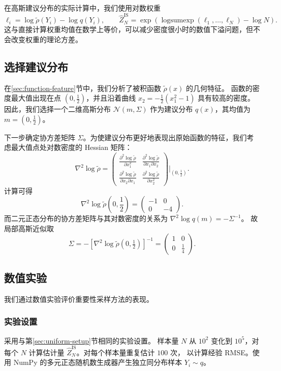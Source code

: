 \documentclass[12pt,a4paper]{ctexart}
\newcommand{\rhoT}{\widetilde{\rho}}
\begin{document}
在高斯建议分布的实际计算中，我们使用对数权重
\[
\ell_i=\log\rhoT(Y_i)-\log q(Y_i),\qquad
\widehat Z_N^{\mathrm{IS}}
=\exp\left(\operatorname{logsumexp}(\ell_1,\ldots,\ell_N)-\log N\right).
\]
这与直接计算权重均值在数学上等价，可以减少密度很小时的数值下溢问题，但不会改变权重的理论方差。

\subsection{选择建议分布}

在\ref{sec:function-feature}节中，我们分析了被积函数 $\rhoT(x)$ 的几何特征。
函数的密度最大值出现在点 $(0, \frac12)$，并且沿着曲线 $x_2 = -\frac12(x_1^2-1)$ 具有较高的密度。
因此，我们选择一个二维高斯分布 $\mathcal N(m, \Sigma)$ 作为建议分布 $q(x)$，其均值为 $m=(0, \frac12)$。

下一步确定协方差矩阵 $\Sigma$。为使建议分布更好地表现出原始函数的特征，我们考虑最大值点处对数密度的 Hessian 矩阵：
\[
\nabla^2 \log\rhoT = \begin{pmatrix}
\frac{\partial^2 \log\rhoT}{\partial x_1^2} & \frac{\partial^2 \log\rhoT}{\partial x_1 \partial x_2} \\
\frac{\partial^2 \log\rhoT}{\partial x_2 \partial x_1} & \frac{\partial^2 \log\rhoT}{\partial x_2^2}
\end{pmatrix}\Bigg|_{(0, \frac12)}.
\]
计算可得
\[
\nabla^2 \log\rhoT(0, \frac12) = \begin{pmatrix}
-1 & 0 \\
0 & -4
\end{pmatrix}.
\]
而二元正态分布的协方差矩阵与其对数密度的关系为 $\nabla^2\log q(m)=-\Sigma^{-1}$。
故局部高斯近似取
\[
\Sigma = -\left[\nabla^2\log\rhoT(0,\tfrac12)\right]^{-1}
= \begin{pmatrix}1 & 0 \\ 0 & \frac14\end{pmatrix}.
\]

\subsection{数值实验}\label{sec:initial-experiments}

我们通过数值实验评价重要性采样方法的表现。

\subsubsection{实验设置}

采用与第\ref{sec:uniform-setup}节相同的实验设置。
样本量 $N$ 从 $10^2$ 变化到 $10^5$，对每个 $N$ 计算估计量
$\widehat Z_N^{\mathrm{IS}}$。对每个样本量重复估计 $100$ 次，
以计算经验 RMSE。使用 NumPy 的多元正态随机数生成器产生独立同分布样本 $Y_i\sim q$。
\end{document}
